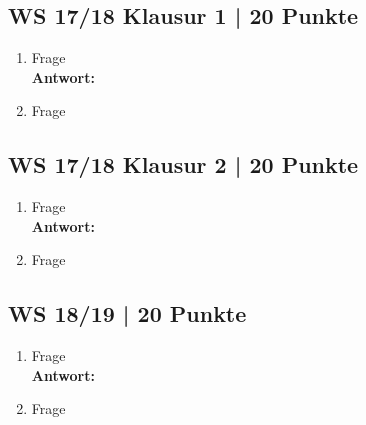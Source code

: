 \subsection{WS 17/18 Klausur 1 | 20 Punkte}
\begin{enumerate}
    \item Frage %
    \\
    \textbf{Antwort:} \\
    \item Frage
\end{enumerate}



\subsection{WS 17/18 Klausur 2 | 20 Punkte}
\begin{enumerate}
    \item Frage %
    \\
    \textbf{Antwort:} \\
    \item Frage
\end{enumerate}

\subsection{WS 18/19 | 20 Punkte} %
\begin{enumerate}
    \item Frage %
    \\
    \textbf{Antwort:} \\
    \item Frage
\end{enumerate}



